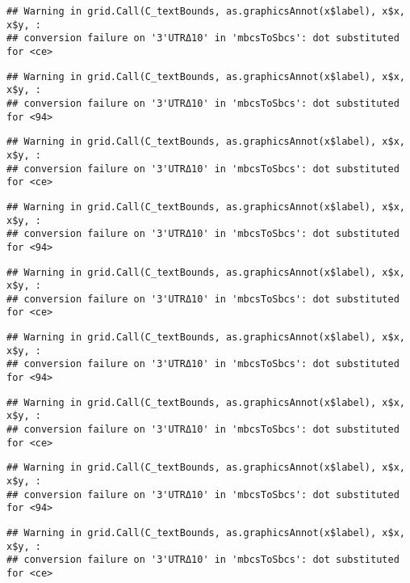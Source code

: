 \documentclass[
]{article}
\begin{document}
\begin{verbatim}
## Warning in grid.Call(C_textBounds, as.graphicsAnnot(x$label), x$x, x$y, :
## conversion failure on '3'UTRΔ10' in 'mbcsToSbcs': dot substituted for <ce>
\end{verbatim}

\begin{verbatim}
## Warning in grid.Call(C_textBounds, as.graphicsAnnot(x$label), x$x, x$y, :
## conversion failure on '3'UTRΔ10' in 'mbcsToSbcs': dot substituted for <94>
\end{verbatim}

\begin{verbatim}
## Warning in grid.Call(C_textBounds, as.graphicsAnnot(x$label), x$x, x$y, :
## conversion failure on '3'UTRΔ10' in 'mbcsToSbcs': dot substituted for <ce>
\end{verbatim}

\begin{verbatim}
## Warning in grid.Call(C_textBounds, as.graphicsAnnot(x$label), x$x, x$y, :
## conversion failure on '3'UTRΔ10' in 'mbcsToSbcs': dot substituted for <94>
\end{verbatim}

\begin{verbatim}
## Warning in grid.Call(C_textBounds, as.graphicsAnnot(x$label), x$x, x$y, :
## conversion failure on '3'UTRΔ10' in 'mbcsToSbcs': dot substituted for <ce>
\end{verbatim}

\begin{verbatim}
## Warning in grid.Call(C_textBounds, as.graphicsAnnot(x$label), x$x, x$y, :
## conversion failure on '3'UTRΔ10' in 'mbcsToSbcs': dot substituted for <94>
\end{verbatim}

\begin{verbatim}
## Warning in grid.Call(C_textBounds, as.graphicsAnnot(x$label), x$x, x$y, :
## conversion failure on '3'UTRΔ10' in 'mbcsToSbcs': dot substituted for <ce>
\end{verbatim}

\begin{verbatim}
## Warning in grid.Call(C_textBounds, as.graphicsAnnot(x$label), x$x, x$y, :
## conversion failure on '3'UTRΔ10' in 'mbcsToSbcs': dot substituted for <94>
\end{verbatim}

\begin{verbatim}
## Warning in grid.Call(C_textBounds, as.graphicsAnnot(x$label), x$x, x$y, :
## conversion failure on '3'UTRΔ10' in 'mbcsToSbcs': dot substituted for <ce>
\end{verbatim}
\end{document}
